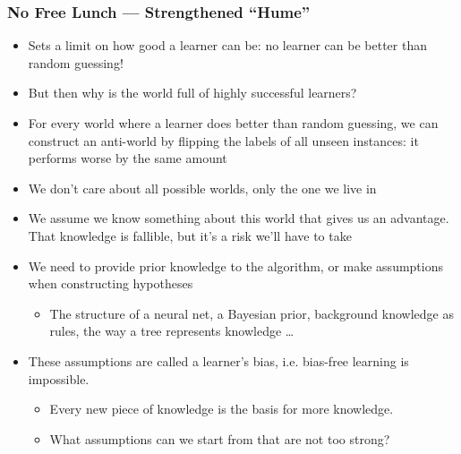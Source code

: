 \documentclass[UTF8,11pt,colorlinks,compress,openany]{beamer}%
\begin{document}
\begin{frame}\frametitle{No Free Lunch --- Strengthened ``Hume''}
\begin{itemize}[ball]
	\item Sets a limit on how good a learner can be: no learner can be better than random guessing!
	\item But then why is the world full of highly successful learners?
	\item For every world where a learner does better than random guessing, we can construct an anti-world by flipping the labels of all unseen instances: it performs worse by the same amount
	\item We don't care about all possible worlds, only the one we live in
	\item We assume we know something about this world that gives us an advantage. That knowledge is fallible, but it's a risk we'll have to take
\end{itemize}
\begin{itemize}
	\item We need to provide prior knowledge to the algorithm, or make assumptions when constructing hypotheses
	\begin{itemize}
		\item The structure of a neural net, a Bayesian prior, background knowledge as rules, the way a tree represents knowledge \dots
	\end{itemize}
	\item These assumptions are called a learner's bias, i.e. bias-free learning is impossible.
	\begin{itemize}
		\item Every new piece of knowledge is the basis for more knowledge.
		\item What assumptions can we start from that are not too strong?
	\end{itemize}
\end{itemize}
\end{frame}
\end{document}
